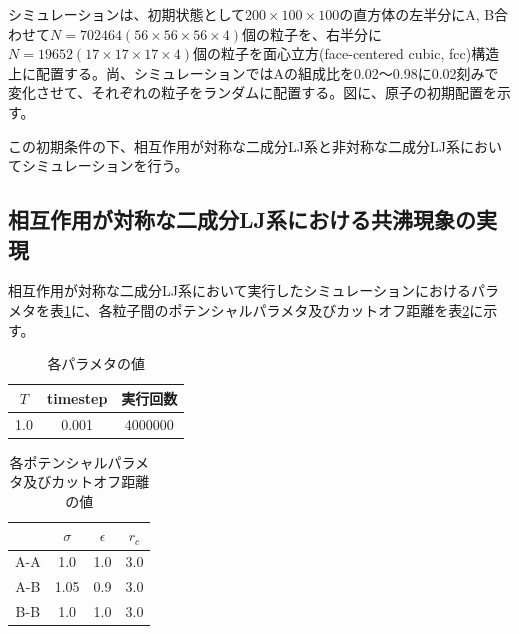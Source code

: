 \documentclass[titlepage]{jsreport}
\begin{document}
シミュレーションは、初期状態として$200×100×100$の直方体の左半分にA, B合わせて$N=702464(56×56×56×4)$個の粒子を、右半分に$N=19652(17×17×17×4)$個の粒子を面心立方(face-centered cubic, fcc)構造上に配置する。尚、シミュレーションではAの組成比を0.02〜0.98に0.02刻みで変化させて、それぞれの粒子をランダムに配置する。図に、原子の初期配置を示す。

この初期条件の下、相互作用が対称な二成分LJ系と非対称な二成分LJ系においてシミュレーションを行う。

\subsection{相互作用が対称な二成分LJ系における共沸現象の実現} \label{method-subsec:bi-symmetric-component-azeotrope}
相互作用が対称な二成分LJ系において実行したシミュレーションにおけるパラメタを表\ref{table:symmetric-bi-component-azeotrope-parameter}に、各粒子間のポテンシャルパラメタ及びカットオフ距離を表\ref{table:symmetric-bi-component-azeotrope-potential-parameter}に示す。

\begin{table}[htbp]
    \begin{center}
        \caption{各パラメタの値}
        \label{table:symmetric-bi-component-azeotrope-parameter}
            \begin{tabular}{c c c}
                $T$ & timestep & 実行回数 \\
                \hline
                1.0 & 0.001 & 4000000 \\
            \end{tabular}
    \end{center}
\end{table}

\begin{table}[htbp]
    \begin{center}
        \caption{各ポテンシャルパラメタ及びカットオフ距離の値}
        \label{table:symmetric-bi-component-azeotrope-potential-parameter}
            \begin{tabular}{c c c c}
                & $\sigma$ & $\epsilon$ & $r_c$ \\
                \hline
                A-A & 1.0 & 1.0 & 3.0 \\
                A-B & 1.05 & 0.9 & 3.0 \\
                B-B & 1.0 & 1.0 & 3.0
            \end{tabular}
    \end{center}
\end{table}
\end{document}

